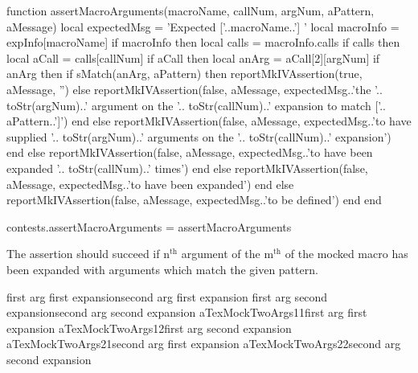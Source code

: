 \startLuaCode
function assertMacroArguments(macroName,
                              callNum,
                              argNum,
                              aPattern,
                              aMessage)
  local expectedMsg = 'Expected ['..macroName..'] '
  local macroInfo = expInfo[macroName]
  if macroInfo then
    local calls = macroInfo.calls
    if calls then
      local aCall = calls[callNum]
      if aCall then
        local anArg = aCall[2][argNum]
        if anArg then
          if sMatch(anArg, aPattern) then
            reportMkIVAssertion(true, aMessage, '')
          else
            reportMkIVAssertion(false, aMessage,
              expectedMsg..'the '..
              toStr(argNum)..' argument on the '..
              toStr(callNum)..' expansion to match ['..
              aPattern..']')
          end
        else
          reportMkIVAssertion(false, aMessage,
            expectedMsg..'to have supplied '..
            toStr(argNum)..' arguments on the '..
            toStr(callNum)..' expansion')
        end
      else
        reportMkIVAssertion(false, aMessage,
          expectedMsg..'to have been expanded '..
          toStr(callNum)..' times')
      end
    else
      reportMkIVAssertion(false, aMessage,
        expectedMsg..'to have been expanded')
    end
  else
    reportMkIVAssertion(false, aMessage,
      expectedMsg..'to be defined')
  end
end

contests.assertMacroArguments = assertMacroArguments
\stopLuaCode


The \type{\assertMacroNthArgumentOnMthExpansionMatches} assertion should 
succeed if $\text{n}^{\text{th}}$ argument of the $\text{m}^{\text{th}}$ 
of the mocked macro has been expanded with arguments which match the given 
pattern. 

\startConTest
\begingroup
  \aTexMockTwoArgs%
    {first arg first expansion}{second arg first expansion}
  \aTexMockTwoArgs%
    {first arg second expansion}{second arg second expansion}
  \assertMacroNthArgumentOnMthExpansionMatches%
    {aTexMockTwoArgs}{1}{1}{first arg first expansion}{}
  \assertMacroNthArgumentOnMthExpansionMatches%
    {aTexMockTwoArgs}{1}{2}{first arg second expansion}{}
  \assertMacroNthArgumentOnMthExpansionMatches%
    {aTexMockTwoArgs}{2}{1}{second arg first expansion}{}
  \assertMacroNthArgumentOnMthExpansionMatches%
    {aTexMockTwoArgs}{2}{2}{second arg second expansion}{}
\endgroup
\stopConTest
\stopTestCase

